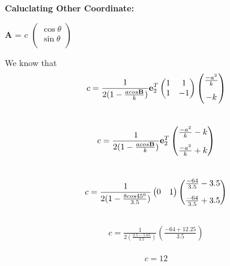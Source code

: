\documentclass{article}
\let\vec\mathbf
\begin{document}
\raggedright\textbf{Caluclating Other Coordinate: } \\
  \raggedright  $\vec{A}$ = c
  $\begin{pmatrix} 
 \cos \theta\\
  \sin\theta \\
\end{pmatrix}$ \\
\raggedright We know that
\begin{equation}  
	c    
        =
	\frac{1}{2(1-\frac{acos\vec{B}}{k})}
	 \vec{e}_2^T
 \begin{pmatrix} 
       1 & 1  \\
       1 & -1 \\
     \end{pmatrix}
	\begin{pmatrix}
         \frac{-a^2}{k} \vspace{3mm} \\
         -k \\
	\end{pmatrix}
     \end{equation}\\
  \begin{equation}
          c
	  =
         \frac{1}{2(1-\frac{acos\vec{B}}{k})}
	  \vec{e}_2^T
	  \begin{pmatrix}
	  \frac{-a^2}{k}-k \vspace{3mm} \\
             \frac{-a^2}{k}+k
          \end{pmatrix}
  \end{equation}\\
\begin{equation}
         c
         =
         \frac{1}{2(1-\frac{8cos45^0}{3.5})}
	  \begin{pmatrix}
	   0 & 1
	  \end{pmatrix} 
     \begin{pmatrix}
	  \frac{-64}{3.5}-3.5 \vspace{3mm} \\
	   \frac{-64}{3.5}+3.5 
     \end{pmatrix}
   \end{equation}\\
\begin{align}
	 c
	 =
	 \frac{1}{2\left(\frac{3.5-5.65}{3.5}\right)}
	 \left(\frac{-64+12.25}{3.5}\right) 
     \end{align}\\
     \begin{equation}
	 c = 12
      \end{equation}	     
\end{document}
